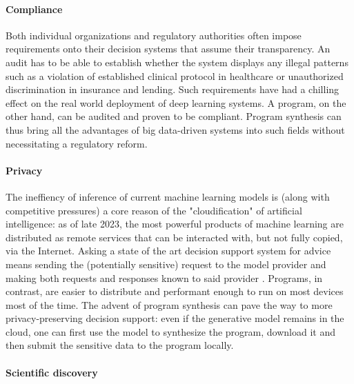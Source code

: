 \paragraph{Compliance}

Both individual organizations and regulatory authorities often impose requirements onto their decision systems that assume their transparency. 
An audit has to be able to establish whether the system displays any illegal patterns such as a violation of established clinical protocol in healthcare or unauthorized discrimination in insurance and lending. 
Such requirements have had a chilling effect on the real world deployment of deep learning systems. 
A program, on the other hand, can be audited and proven to be compliant. 
Program synthesis can thus bring all the advantages of big data-driven systems into such fields without necessitating a regulatory reform.

\paragraph{Privacy}

The ineffiency of inference of current machine learning models is (along with competitive pressures) a core reason of the "cloudification" of artificial intelligence: as of late 2023, the most powerful products of machine learning \cite{achiamGpt4TechnicalReport2023} are distributed as remote services that can be interacted with, but not fully copied, via the Internet.
Asking a state of the art decision support system for advice means sending the (potentially sensitive) request to the model provider and making both requests and responses known to said provider \cite{PrivacyPolicy}.
Programs, in contrast, are easier to distribute and performant enough to run on most devices most of the time.
The advent of program synthesis can pave the way to more privacy-preserving decision support: even if the generative model remains in the cloud, one can first use the model to synthesize the program, download it and then submit the sensitive data to the program locally.


\paragraph{Scientific discovery}

